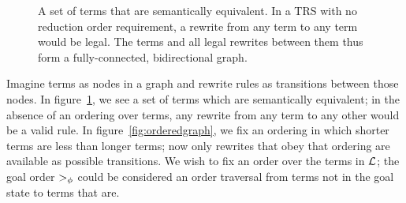 \begin{figure}
\centering
{}
\label{fig:unorderedgraph}
\caption{A set of terms that are semantically equivalent. In a TRS with no reduction order requirement, a rewrite from any term to any term would be legal. The terms and all legal rewrites between them thus form a fully-connected, bidirectional graph.}
\end{figure}

Imagine terms as nodes in a graph and rewrite rules as transitions between those nodes. In figure~\ref{fig:unorderedgraph}, we see a set of terms which are semantically equivalent; in the absence of an ordering over terms, any rewrite from any term to any other would be a valid rule. In figure~\ref{fig:orderedgraph}, we fix an ordering in which shorter terms are less than longer terms; now only rewrites that obey that ordering are available as possible transitions. We wish to fix an order over the terms in $\mathcal{L}$; the goal order $>_{\phi}$ could be considered an order traversal from terms not in the goal state to terms that are. 

